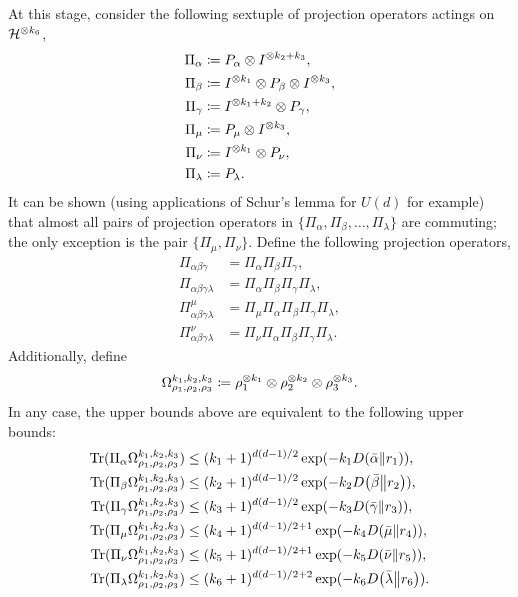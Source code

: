 \documentclass[notitlepage, 10pt]{article}
\begin{document}
At this stage, consider the following sextuple of projection operators actings on $\mathcal H^{\otimes k_6}$,
\begin{align}
    \Pi_{\alpha} &\coloneqq P_{\alpha} \otimes I^{\otimes k_2 + k_3}, \\
    \Pi_{\beta} &\coloneqq I^{\otimes k_1} \otimes P_{\beta} \otimes I^{\otimes k_3}, \\
    \Pi_{\gamma} &\coloneqq I^{\otimes k_1 + k_2} \otimes P_{\gamma} , \\
    \Pi_{\mu} &\coloneqq P_{\mu} \otimes I^{\otimes k_3}, \\
    \Pi_{\nu} &\coloneqq I^{\otimes k_1} \otimes P_{\nu}, \\
    \Pi_{\lambda} &\coloneqq P_{\lambda}.
\end{align}
It can be shown (using applications of Schur's lemma for $U(d)$ for example) that almost all pairs of projection operators in $\{\Pi_{\alpha}, \Pi_{\beta}, \ldots, \Pi_{\lambda}\}$ are commuting; the only exception is the pair $\{ \Pi_{\mu}, \Pi_{\nu} \}$.
Define the following projection operators,
\begin{align}
    \Pi_{\alpha\beta\gamma} &= \Pi_{\alpha}\Pi_{\beta}\Pi_{\gamma}, \\
    \Pi_{\alpha\beta\gamma\lambda} &= \Pi_{\alpha}\Pi_{\beta}\Pi_{\gamma}\Pi_{\lambda}, \\
    \Pi^{\mu}_{\alpha\beta\gamma\lambda} &= \Pi_{\mu}\Pi_{\alpha}\Pi_{\beta}\Pi_{\gamma}\Pi_{\lambda}, \\
    \Pi^{\nu}_{\alpha\beta\gamma\lambda} &= \Pi_{\nu}\Pi_{\alpha}\Pi_{\beta}\Pi_{\gamma}\Pi_{\lambda}.
\end{align}
Additionally, define
\begin{equation}
    \Omega_{\rho_1,\rho_2,\rho_3}^{k_1, k_2, k_3} \coloneqq \rho_1^{\otimes k_1} \otimes \rho_2^{\otimes k_2} \otimes \rho_3^{\otimes k_3}.
\end{equation}
In any case, the upper bounds above are equivalent to the following upper bounds:
\begin{align}
    \operatorname{Tr}(\Pi_{\alpha} \Omega_{\rho_1,\rho_2,\rho_3}^{k_1, k_2, k_3}) &\leq (k_1 + 1)^{d(d-1)/2} \exp(-k_1 D\!\left(\bar \alpha\middle\|r_1\right)), \\
    \operatorname{Tr}(\Pi_{\beta} \Omega_{\rho_1,\rho_2,\rho_3}^{k_1, k_2, k_3}) &\leq (k_2 + 1)^{d(d-1)/2} \exp(-k_2 D\!\left(\bar \beta\middle\|r_2\right)), \\
    \operatorname{Tr}(\Pi_{\gamma} \Omega_{\rho_1,\rho_2,\rho_3}^{k_1, k_2, k_3}) &\leq (k_3 + 1)^{d(d-1)/2} \exp(-k_3 D\!\left(\bar \gamma\middle\|r_3\right)), \\
    \operatorname{Tr}(\Pi_{\mu} \Omega_{\rho_1,\rho_2,\rho_3}^{k_1, k_2, k_3}) &\leq (k_4+1)^{d(d-1)/2+1} \exp(-k_4 D\!\left(\bar \mu\middle\|r_4\right)), \\
    \operatorname{Tr}(\Pi_{\nu} \Omega_{\rho_1,\rho_2,\rho_3}^{k_1, k_2, k_3}) &\leq (k_5+1)^{d(d-1)/2+1} \exp(-k_5 D\!\left(\bar \nu\middle\|r_5\right)), \\
    \operatorname{Tr}(\Pi_{\lambda} \Omega_{\rho_1,\rho_2,\rho_3}^{k_1, k_2, k_3}) &\leq (k_6+1)^{d(d-1)/2+2} \exp(-k_6 D\!\left(\bar \lambda\middle\|r_6\right)).
\end{align}
\end{document}
